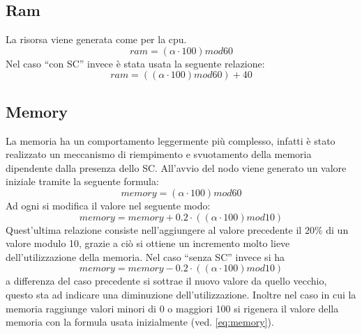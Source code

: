 \subsection{Ram}
La risorsa viene generata come per la cpu.
\begin{equation}
ram = (\alpha \cdot 100) mod 60
\end{equation}
Nel caso ``con SC'' invece è stata usata la seguente relazione:
\begin{equation}
ram = ((\alpha \cdot 100) mod 60) + 40
\end{equation}
\subsection{Memory}
La memoria ha un comportamento leggermente più complesso, infatti è stato realizzato un meccanismo di riempimento e svuotamento della memoria dipendente dalla presenza dello SC. All'avvio del nodo viene generato un valore iniziale tramite la seguente formula:
\begin{equation}\label{eq:memory}
memory = (\alpha \cdot 100) mod 60
\end{equation}
Ad ogni  si modifica il valore nel seguente modo:
\begin{equation}
memory = memory + 0.2 \cdot ((\alpha \cdot 100) mod 10)
\end{equation}
Quest'ultima relazione consiste nell'aggiungere al valore precedente il $20\%$ di un valore modulo 10, grazie a ciò si ottiene un incremento molto lieve dell'utilizzazione della memoria.
Nel caso ``senza SC'' invece si ha
\begin{equation}
memory = memory - 0.2 \cdot ( ( \alpha \cdot 100 ) mod 10 )
\end{equation}
a differenza del caso precedente si sottrae il nuovo valore da quello vecchio, questo sta ad indicare una diminuzione dell'utilizzazione. Inoltre nel caso in cui la memoria raggiunge valori minori di 0 o maggiori 100 si rigenera il valore della memoria con la formula usata inizialmente (ved. \ref{eq:memory}).
